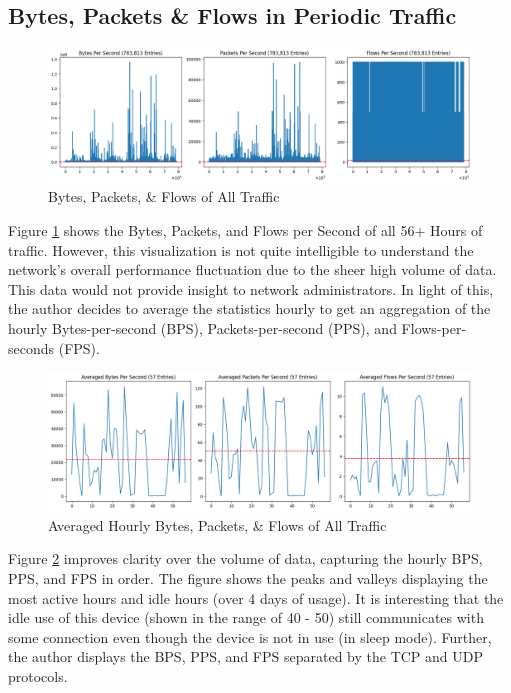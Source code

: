 \documentclass{article}
\begin{document}
\subsection{Bytes, Packets \& Flows in Periodic Traffic}

\begin{figure}[htbp]
    \centering
    \includegraphics[width=1\linewidth]{img/bpf-all.png}
    \caption{Bytes, Packets, \& Flows of All Traffic}
    \label{fig:nfanalbpf}
\end{figure}

Figure \ref{fig:nfanalbpf} shows the Bytes, Packets, and Flows per Second of all 56+ Hours of traffic. However, this visualization is not quite intelligible to understand the network's overall performance fluctuation due to the sheer high volume of data. This data would not provide insight to network administrators. In light of this, the author decides to average the statistics hourly to get an aggregation of the hourly Bytes-per-second (BPS), Packets-per-second (PPS), and Flows-per-seconds (FPS).

\begin{figure}[htbp]
    \centering
    \includegraphics[width=1\linewidth]{img/bpf-h.png}
    \caption{Averaged Hourly Bytes, Packets, \& Flows of All Traffic}
    \label{fig:nfanalbpfh}
\end{figure}

Figure \ref{fig:nfanalbpfh} improves clarity over the volume of data, capturing the hourly BPS, PPS, and FPS in order. The figure shows the peaks and valleys displaying the most active hours and idle hours (over 4 days of usage). It is interesting that the idle use of this device (shown in the range of 40 - 50) still communicates with some connection even though the device is not in use (in sleep mode). Further, the author displays the BPS, PPS, and FPS separated by the TCP and UDP protocols.
\end{document}
